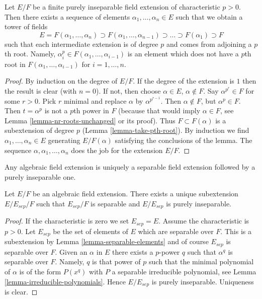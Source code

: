 \begin{lemma}
\label{lemma-finite-purely-inseparable}
Let $E/F$ be a finite purely inseparable field extension of
characteristic $p > 0$. Then there exists a sequence of elements
$\alpha_1, \ldots, \alpha_n \in E$ such that we obtain a tower
of fields
$$
E = F(\alpha_1, \ldots, \alpha_n) \supset
F(\alpha_1, \ldots, \alpha_{n - 1}) \supset
\ldots
\supset F(\alpha_1) \supset F
$$
such that each intermediate extension is of degree $p$ and comes
from adjoining a $p$th root. Namely,
$\alpha_i^p \in F(\alpha_1, \ldots, \alpha_{i - 1})$
is an element which does not have a $p$th root in
$F(\alpha_1, \ldots, \alpha_{i - 1})$ for $i = 1, \ldots, n$.
\end{lemma}

\begin{proof}
By induction on the degree of $E/F$. If the degree of the extension is $1$
then the result is clear (with $n = 0$). If not, then choose
$\alpha \in E$, $\alpha \not \in F$. Say $\alpha^{p^r} \in F$ for some
$r > 0$. Pick $r$ minimal and replace $\alpha$ by $\alpha^{p^{r - 1}}$.
Then $\alpha \not \in F$, but $\alpha^p \in F$. Then $t = \alpha^p$ is not
a $p$th power in $F$ (because that would imply $\alpha \in F$, see
Lemma \ref{lemma-nr-roots-unchanged} or its proof).
Thus $F \subset F(\alpha)$ is a subextension of degree $p$
(Lemma \ref{lemma-take-pth-root}). By induction we find
$\alpha_1, \ldots, \alpha_n \in E$ generating $E/F(\alpha)$
satisfying the conclusions of the lemma.
The sequence $\alpha, \alpha_1, \ldots, \alpha_n$ does the job
for the extension $E/F$.
\end{proof}

\begin{lemma}
\label{lemma-separable-first}
\begin{slogan}
Any algebraic field extension is uniquely a separable field extension
followed by a purely inseparable one.
\end{slogan}
Let $E/F$ be an algebraic field extension. There exists a unique subextension
$E/E_{sep}/F$ such that $E_{sep}/F$ is separable and $E/E_{sep}$ is
purely inseparable.
\end{lemma}

\begin{proof}
If the characteristic is zero we set $E_{sep} = E$. Assume the characteristic
is $p > 0$. Let $E_{sep}$ be the set of elements of $E$ which are separable
over $F$. This is a subextension by Lemma \ref{lemma-separable-elements}
and of course $E_{sep}$ is separable over $F$. Given an $\alpha$ in $E$
there exists a $p$-power $q$ such that $\alpha^q$ is separable over $F$.
Namely, $q$ is that power of $p$ such that the minimal polynomial of
$\alpha$ is of the form $P(x^q)$ with $P$ a separable irreducible polynomial, see
Lemma \ref{lemma-irreducible-polynomials}. Hence $E/E_{sep}$ is purely
inseparable. Uniqueness is clear.
\end{proof}

